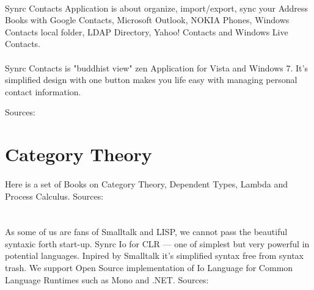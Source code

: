 \documentclass[11pt]{article}
\begin{document}
\paragraph{}
Synrc Contacts Application is about organize,
import/export, sync your Address Books with Google Contacts,
Microsoft Outlook, NOKIA Phones, Windows Contacts local folder,
LDAP Directory, Yahoo! Contacts and Windows Live Contacts.
\paragraph{}
Synrc Contacts is "buddhist view" zen Application for
Vista and Windows 7. It's simplified design with one button
makes you life easy with managing personal contact information.

Sources: 


\section*{Category Theory}
\paragraph{}
Here is a set of Books on Category Theory, Dependent Types, Lambda and Process Calculus.
Sources: 

\section*{}

\paragraph{}
As some of us are fans of Smalltalk and LISP, we cannot pass the
beautiful syntaxic forth start-up. Synrc Io for CLR --- one of simplest but very
powerful in potential languages. Inpired by Smalltalk it's simplified
syntax free from syntax trash. We support Open Source implementation
of Io Language for Common Language Runtimes such as Mono and .NET.
Sources: 
\end{document}
